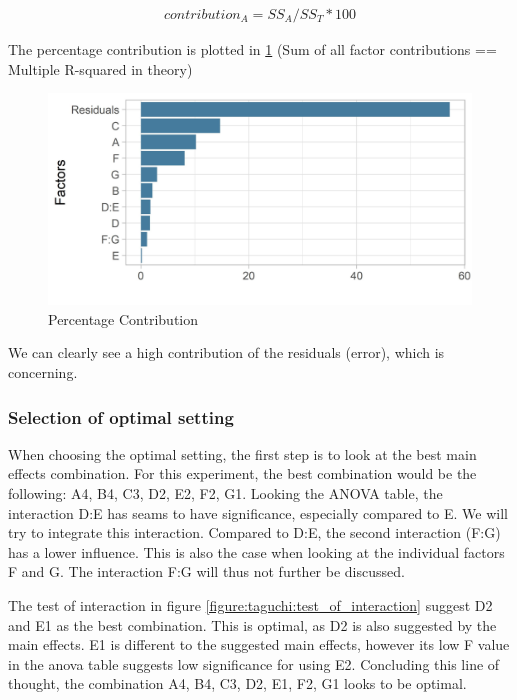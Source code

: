 \begin{equation} \label{equation:taguchi:contribution}
	\begin{split}
		contribution_A = SS_A / SS_T * 100
	\end{split}
\end{equation}

The percentage contribution is plotted in \ref{figure:taguchi:percentage_contribution} (Sum of all factor contributions == Multiple R-squared in theory)
\begin{figure}[ht] 
	\label{figure:taguchi:percentage_contribution}
	\includegraphics[width=1\linewidth]{simulations/taguchi/plots/percentage_contribution}
	\caption{Percentage Contribution}
\end{figure}

We can clearly see a high contribution of the residuals (error), which is concerning. 

\subsubsection{Selection of optimal setting}
When choosing the optimal setting, the first step is to look at the best main effects combination. For this experiment, the best combination would be the following: A4, B4, C3, D2, E2, F2, G1.
Looking the ANOVA table, the interaction D:E has seams to have significance, especially compared to E. We will try to integrate this interaction. Compared to D:E, the second interaction (F:G) has a lower influence. This is also the case when looking at the individual factors F and G. The interaction F:G will thus not further be discussed.

The test of interaction in figure \ref{figure:taguchi:test_of_interaction} suggest D2 and E1 as the best combination. This is optimal, as D2 is also suggested by the main effects. E1 is different to the suggested main effects, however its low F value in the anova table suggests low significance for using E2.
Concluding this line of thought, the combination A4, B4, C3, D2, E1, F2, G1 looks to be optimal.


